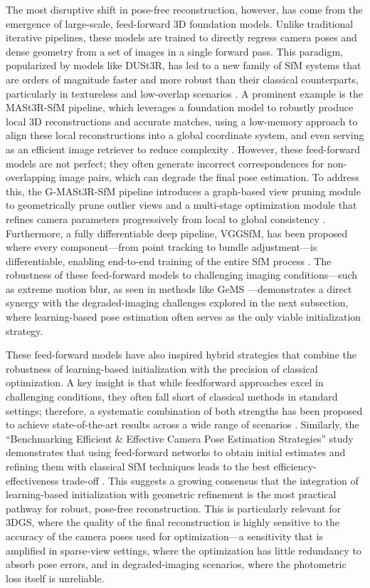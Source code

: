 \documentclass[11pt]{article}
\begin{document}
The most disruptive shift in pose-free reconstruction, however, has come from the emergence of large-scale, feed-forward 3D foundation models. Unlike traditional iterative pipelines, these models are trained to directly regress camera poses and dense geometry from a set of images in a single forward pass. This paradigm, popularized by models like DUSt3R, has led to a new family of SfM systems that are orders of magnitude faster and more robust than their classical counterparts, particularly in textureless and low-overlap scenarios \cite{ref274}. A prominent example is the MASt3R-SfM pipeline, which leverages a foundation model to robustly produce local 3D reconstructions and accurate matches, using a low-memory approach to align these local reconstructions into a global coordinate system, and even serving as an efficient image retriever to reduce complexity \cite{ref275}. However, these feed-forward models are not perfect; they often generate incorrect correspondences for non-overlapping image pairs, which can degrade the final pose estimation. To address this, the G-MASt3R-SfM pipeline introduces a graph-based view pruning module to geometrically prune outlier views and a multi-stage optimization module that refines camera parameters progressively from local to global consistency \cite{ref276}. Furthermore, a fully differentiable deep pipeline, VGGSfM, has been proposed where every component---from point tracking to bundle adjustment---is differentiable, enabling end-to-end training of the entire SfM process \cite{ref277}. The robustness of these feed-forward models to challenging imaging conditions---such as extreme motion blur, as seen in methods like GeMS \cite{ref278}---demonstrates a direct synergy with the degraded-imaging challenges explored in the next subsection, where learning-based pose estimation often serves as the only viable initialization strategy.

These feed-forward models have also inspired hybrid strategies that combine the robustness of learning-based initialization with the precision of classical optimization. A key insight is that while feedforward approaches excel in challenging conditions, they often fall short of classical methods in standard settings; therefore, a systematic combination of both strengths has been proposed to achieve state-of-the-art results across a wide range of scenarios \cite{ref279}. Similarly, the ``Benchmarking Efficient \& Effective Camera Pose Estimation Strategies'' study demonstrates that using feed-forward networks to obtain initial estimates and refining them with classical SfM techniques leads to the best efficiency-effectiveness trade-off \cite{ref280}. This suggests a growing consensus that the integration of learning-based initialization with geometric refinement is the most practical pathway for robust, pose-free reconstruction. This is particularly relevant for 3DGS, where the quality of the final reconstruction is highly sensitive to the accuracy of the camera poses used for optimization---a sensitivity that is amplified in sparse-view settings, where the optimization has little redundancy to absorb pose errors, and in degraded-imaging scenarios, where the photometric loss itself is unreliable.
\end{document}
